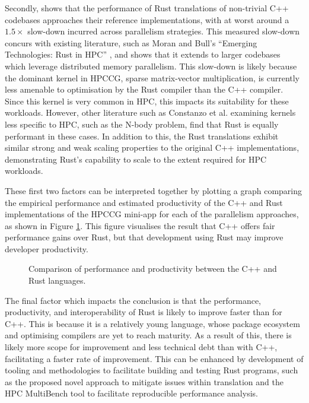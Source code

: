 Secondly,  shows that the performance of Rust translations of non-trivial C++ codebases approaches their reference implementations, with at worst around a $1.5 \times$ slow-down incurred across parallelism strategies. This measured slow-down concurs with existing literature, such as Moran and Bull's ``Emerging Technologies: Rust in HPC'' \cite{moranEmergingTechnologiesRust2023}, and shows that it extends to larger codebases which leverage distributed memory parallelism. This slow-down is likely because the dominant kernel in \acrshort{HPCCG}, sparse matrix-vector multiplication, is currently less amenable to optimisation by the Rust compiler than the C++ compiler. Since this kernel is very common in \acrshort{HPC}, this impacts its suitability for these workloads. However, other literature such as Constanzo et al. \cite{costanzoPerformanceVsProgramming2021} examining kernels less specific to \acrshort{HPC}, such as the N-body problem, find that Rust is equally performant in these cases. In addition to this, the Rust translations exhibit similar strong and weak scaling properties to the original C++ implementations, demonstrating Rust's capability to scale to the extent required for \acrshort{HPC} workloads.

These first two factors can be interpreted together by plotting a graph comparing the empirical performance and estimated productivity of the C++ and Rust implementations of the \acrshort{HPCCG} \acrshort{mini-app} for each of the parallelism approaches, as shown in Figure \ref{fig:conclusions_performance_productivity}. This figure visualises the result that C++ offers fair performance gains over Rust, but that development using Rust may improve developer productivity.

\begin{figure}[H]
    \centering
    \fbox{}
    \captionsetup{skip=0pt}
    \caption{Comparison of performance and productivity between the C++ and Rust languages.}
    \label{fig:conclusions_performance_productivity}
\end{figure}

The final factor which impacts the conclusion is that the performance, productivity, and interoperability of Rust is likely to improve faster than for C++. This is because it is a relatively young language, whose package ecosystem and optimising compilers are yet to reach maturity. As a result of this, there is likely more scope for improvement and less technical debt than with C++, facilitating a faster rate of improvement. This can be enhanced by development of tooling and methodologies to facilitate building and testing Rust programs, such as the proposed novel approach to mitigate issues within translation and the HPC MultiBench tool to facilitate reproducible performance analysis.

